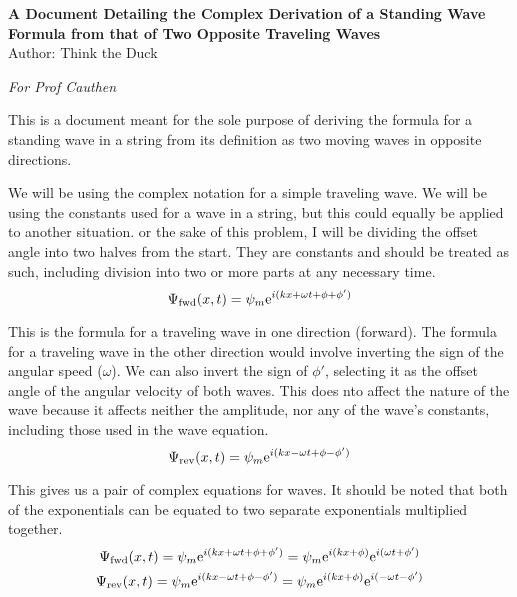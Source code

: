 \documentclass[12pt]{article}
\newcommand{\e}[1]{{\rm e}^{#1}}
\begin{document}
    \begin{center}
        \textbf{A Document Detailing the Complex Derivation of a Standing Wave Formula from that of Two Opposite Traveling Waves}\\
        Author: Think the Duck
    \end{center}
    \textit{For Prof Cauthen}

    This is a document meant for the sole purpose of deriving the formula for a standing wave in a string from its definition as two moving waves in opposite directions.

    We will be using the complex notation for a simple traveling wave. 
    We will be using the constants used for a wave in a string, but this could equally be applied to another situation.
    or the sake of this problem, I will be dividing the offset angle into two halves from the start. 
    They are constants and should be treated as such, including division into two or more parts at any necessary time.
    \begin{equation}
        \Psi_{\rm fwd}(x,t)   =   \psi_m \e{i(kx + \omega t + \phi + \phi')}
    \end{equation}

    This is the formula for a traveling wave in one direction (forward).
    The formula for a traveling wave in the other direction would involve inverting the sign of the angular speed ($\omega$).
    We can also invert the sign of $\phi'$, selecting it as the offset angle of the angular velocity of both waves.
    This does nto affect the nature of the wave because it affects neither the amplitude, nor any of the wave's constants, including those used in the wave equation.
    \begin{equation}
        \Psi_{\rm rev}(x,t)   =   \psi_m \e{i(kx - \omega t + \phi - \phi')}
    \end{equation}

    This gives us a pair of complex equations for waves. 
    It should be noted that both of the exponentials can be equated to two separate exponentials multiplied together.
    \begin{gather}
        \Psi_{\rm fwd}(x,t)   =   \psi_m \e{i(kx + \omega t + \phi + \phi')}
            =   \psi_m \e{i(kx + \phi)} \e{i(\omega t + \phi')}\\
        \Psi_{\rm rev}(x,t)   =   \psi_m \e{i(kx - \omega t + \phi - \phi')}
            =   \psi_m \e{i(kx + \phi)} \e{i(-\omega t - \phi')}
    \end{gather}
\end{document}
